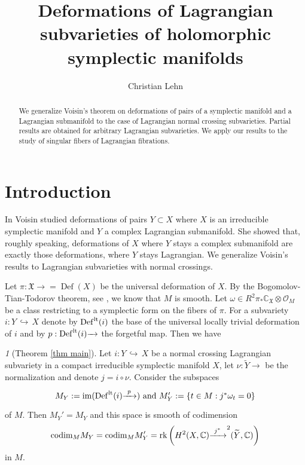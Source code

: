 \documentclass[a4paper,11pt,final]{amsart}
\title[Deformations of Lagrangian subvarieties]{Deformations of Lagrangian subvarieties of holomorphic symplectic manifolds}
\author{Christian Lehn}
\theoremstyle{plain}
\theoremstyle{definition}
\numberwithin{equation}{section}
\theoremstyle{remark}
\newtheorem*{custom}{}}
\begin{document}
\thispagestyle{empty}

\begin{abstract}
We generalize Voisin's theorem on deformations of pairs of a symplectic manifold and a Lagrangian submanifold to the case of Lagrangian normal crossing subvarieties. Partial results are obtained for arbitrary Lagrangian subvarieties. We apply our results to the study of singular fibers of Lagrangian fibrations.
\end{abstract}


\maketitle

\setlength{\parindent}{0em}
\setcounter{tocdepth}{1}

\tableofcontents 

\section*{Introduction}

In \cite{Vo92} Voisin studied deformations of pairs $Y\subset X$ where $X$ is an irreducible symplectic manifold and $Y$ a complex Lagrangian submanifold. She showed that, roughly speaking, deformations of $X$ where $Y$ stays a complex submanifold are exactly those deformations, where $Y$ stays Lagrangian. 
We generalize Voisin's results to Lagrangian subvarieties with normal crossings. 

Let $\pi:{{\mathfrak X}} {\xrightarrow{\ \ }}={{\operatorname{Def}}}(X)$ be the universal deformation of $X$. By the Bogomolov-Tian-Todorov theorem, see \cite{Bo78,Ti,To89}, we know that $M$ is smooth. Let $\omega \in R^2\pi_*{{\mathbb C}}_{{\mathfrak X}}{\otimes} {{\mathcal O}}_M$ be a class restricting to a symplectic form on the fibers of $\pi$. For a subvariety $i: Y{{\, \hookrightarrow\,}} X$ denote by ${{\operatorname{Def}}}^{{\rm{lt}}}(i)$ the base of the universal locally trivial deformation of $i$ and by $p:{{\operatorname{Def}}}^{{\rm{lt}}}(i){\xrightarrow{\ \ }}$ the forgetful map. Then we have

\begin{custom}[Theorem \ref{thm main}]
Let $i:Y {{\, \hookrightarrow\,}} X$ be a normal crossing Lagrangian subvariety in a compact irreducible symplectic manifold $X$, let $\nu:{{\widetilde{Y}}}{\xrightarrow{\ \ }}$ be the normalization and denote $j=i\circ\nu$. Consider the subspaces
\[
\begin{xy}
\xymatrix@R=0em{
M_Y := {\operatorname{im}}({{\operatorname{Def}}}^{{\rm{lt}}}(i) {\xrightarrow{\ p\ }}) \textrm{ and } M_Y' := \left\{t \in M : j^*\omega_t  = 0\right\}\\
}
\end{xy}
\]
of $M$. Then $M_Y'=M_Y$ and this space is smooth of codimension
\[
{\operatorname{codim}}_M M_Y = {\operatorname{codim}}_M M'_Y = {{\rm rk}}\left(H^2(X,{{\mathbb C}}) {\xrightarrow{\ j^*\ }}^2({{\widetilde{Y}}},{{\mathbb C}})\right)
\]
in $M$.
\end{custom}
\end{document}
